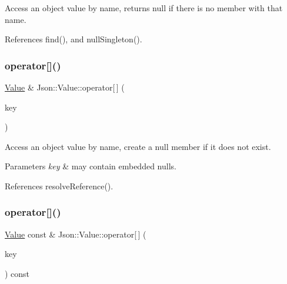 Access an object value by name, returns null if there is no member with that name. 

References find(), and null\+Singleton().

\mbox{\label{classJson_1_1Value_aedd1e152756a4cc8c1ebac0dd7aeeb78_aedd1e152756a4cc8c1ebac0dd7aeeb78}} 
\subsubsection{\texorpdfstring{operator[]()}{operator[]()}\hspace{0.1cm}{\footnotesize\ttfamily [7/9]}}
{\footnotesize\ttfamily \hyperlink{classJson_1_1Value}{Value} \& Json\+::\+Value\+::operator\mbox{[}$\,$\mbox{]} (\begin{DoxyParamCaption}\item[{const \hyperlink{json_8h_a1e723f95759de062585bc4a8fd3fa4be_a1e723f95759de062585bc4a8fd3fa4be}{J\+S\+O\+N\+C\+P\+P\+\_\+\+S\+T\+R\+I\+NG} \&}]{key }\end{DoxyParamCaption})}

Access an object value by name, create a null member if it does not exist. 
\begin{DoxyParams}{Parameters}
{\em key} & may contain embedded nulls. \\
\hline
\end{DoxyParams}


References resolve\+Reference().

\mbox{\label{classJson_1_1Value_aba60f69dcd85e935aa85e7a517e03427_aba60f69dcd85e935aa85e7a517e03427}} 
\subsubsection{\texorpdfstring{operator[]()}{operator[]()}\hspace{0.1cm}{\footnotesize\ttfamily [8/9]}}
{\footnotesize\ttfamily \hyperlink{classJson_1_1Value}{Value} const  \& Json\+::\+Value\+::operator\mbox{[}$\,$\mbox{]} (\begin{DoxyParamCaption}\item[{const \hyperlink{json_8h_a1e723f95759de062585bc4a8fd3fa4be_a1e723f95759de062585bc4a8fd3fa4be}{J\+S\+O\+N\+C\+P\+P\+\_\+\+S\+T\+R\+I\+NG} \&}]{key }\end{DoxyParamCaption}) const}

